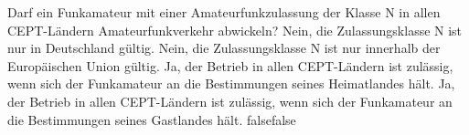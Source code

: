     {Darf ein Funkamateur mit einer Amateurfunkzulassung der Klasse N in allen CEPT-Ländern Amateurfunkverkehr abwickeln?}
    {Nein, die Zulassungsklasse N ist nur in Deutschland gültig.}
    {Nein, die Zulassungsklasse N ist nur innerhalb der Europäischen Union gültig.}
    {Ja, der Betrieb in allen CEPT-Ländern ist zulässig, wenn sich der Funkamateur an die Bestimmungen seines Heimatlandes hält.}
    {Ja, der Betrieb in allen CEPT-Ländern ist zulässig, wenn sich der Funkamateur an die Bestimmungen seines Gastlandes hält.}
    {false}{false}